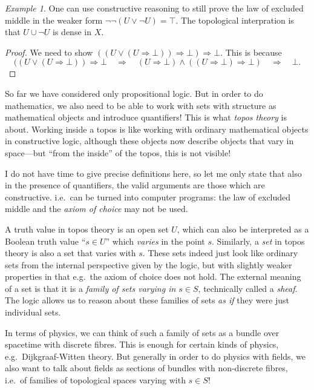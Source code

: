 \documentclass[11pt, oneside, article]{memoir}
\theoremstyle{plain}
\theoremstyle{definition}
\theoremstyle{remark}
\newtheorem{example}[theorem]{Example}
\newcommand{\imp}{\Rightarrow}
\begin{document}
\begin{example}
One can use constructive reasoning to still prove the law of excluded middle in the weaker form $\lnot\lnot(U \lor \lnot U) = \top$. The topological interpration is that $U \cup \lnot U$ is dense in $X$.
\end{example}

\begin{proof}
	We need to show $((U \lor (U \imp \bot)) \imp \bot) \imp \bot$. This is because
	\[
		((U \lor (U \imp \bot)) \imp \bot \quad \Longrightarrow \quad (U \imp \bot) \land ((U \imp \bot) \imp \bot) \quad \Longrightarrow \quad \bot.
	\]
\end{proof}

So far we have considered only propositional logic. But in order to do mathematics, we also need to be able to work with sets with structure as mathematical objects and introduce quantifiers! This is what \emph{topos theory} is about. Working inside a topos is like working with ordinary mathematical objects in constructive logic, although these objects now describe objects that vary in space---but ``from the inside'' of the topos, this is not visible!

I do not have time to give precise definitions here, so let me only state that also in the presence of quantifiers, the valid arguments are those which are constructive. i.e.~can be turned into computer programs: the law of excluded middle and the \emph{axiom of choice} may not be used.

A truth value in topos theory is an open set $U$, which can also be interpreted as a Boolean truth value ``$s\in U$'' which \emph{varies} in the point $s$. Similarly, a \emph{set} in topos theory is also a set that varies with $s$. These sets indeed just look like ordinary sets from the internal perspective given by the logic, but with slightly weaker properties in that e.g.~the axiom of choice does not hold. The external meaning of a set is that it is a \emph{family of sets varying in $s\in S$}, technically called a \emph{sheaf}. The logic allows us to reason about these families of sets \emph{as if} they were just individual sets.

In terms of physics, we can think of such a family of sets as a bundle over spacetime with discrete fibres. This is enough for certain kinds of physics, e.g.~Dijkgraaf-Witten theory. But generally in order to do physics with fields, we also want to talk about fields as sections of bundles with non-discrete fibres, i.e.~of families of topological spaces varying with $s \in S$!
\end{document}

